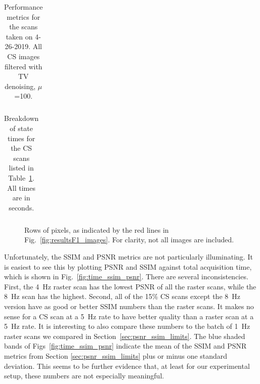 \documentclass[twocolumn,twoside]{IEEEtran/IEEEtran}
\begin{document}
%   


\begin{table}[t!]
  \centering
  \caption{Performance metrics for the scans taken on 4-26-2019. All CS images
    filtered with TV denoising, $\mu$=100.}
  \begin{tabular}{cccccc}
    
  \end{tabular}
  \label{tab:rast_vs_cs_v1}
\end{table}

\begin{table}[t!]
  \centering
  \caption{Breakdown of state times for the CS scans listed in
    Table~\ref{tab:rast_vs_cs_v1}. All times are in seconds.}
  \label{tab:final_state_times}
  \begin{tabular}{ccccccc}
    
  \end{tabular}
\end{table}

\begin{figure}[t!]
  
  \caption{Rows of pixels, as indicated by the red lines in
    Fig.~\ref{fig:resultsF1_images}. For clarity, not all images are included.}
  \label{fig:pixel_rows}
\end{figure}

Unfortunately, the SSIM and PSNR metrics are not particularly illuminating. It
is easiest to see this by plotting PSNR and SSIM against total acquisition time,
which is shown in Fig.~\ref{fig:time_ssim_psnr}. There are several
inconsistencies. First, the 4~Hz raster scan has the lowest PSNR of all the
raster scans, while the 8~Hz scan has the highest. Second, all of the 15\% CS
scans except the 8~Hz version have as good or better SSIM numbers than the
raster scans. It makes no sense for a CS scan at a 5~Hz rate to have better
quality than a raster scan at a 5~Hz rate. It is interesting to also compare
these numbers to the batch of 1~Hz raster scans we compared in
Section~\ref{sec:psnr_ssim_limits}. The blue shaded bands of
Figs~\ref{fig:time_ssim_psnr} indicate the mean of the SSIM and PSNR metrics
from Section \ref{sec:psnr_ssim_limits} plus or minus one standard deviation.
This seems to be further evidence that, at least for our experimental setup,
these numbers are not especially meaningful.
\end{document}
